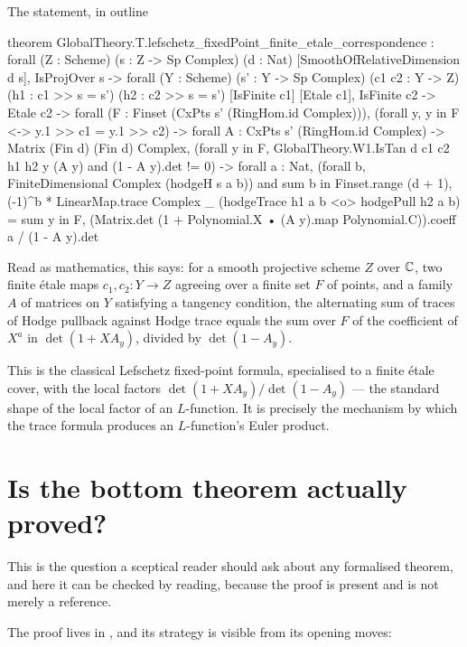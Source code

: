 \begin{seamnote}{The statement, in outline}
\begin{leanquote}
theorem GlobalTheory.T.lefschetz_fixedPoint_finite_etale_correspondence :
  forall (Z : Scheme) (s : Z -> Sp Complex) (d : Nat) [SmoothOfRelativeDimension d s],
    IsProjOver s ->
  forall (Y : Scheme) (s' : Y -> Sp Complex) (c1 c2 : Y -> Z)
    (h1 : c1 >> s = s') (h2 : c2 >> s = s') [IsFinite c1] [Etale c1],
    IsFinite c2 -> Etale c2 ->
  forall (F : Finset (CxPts s' (RingHom.id Complex))),
    (forall y, y in F <-> y.1 >> c1 = y.1 >> c2) ->
  forall A : CxPts s' (RingHom.id Complex) -> Matrix (Fin d) (Fin d) Complex,
    (forall y in F, GlobalTheory.W1.IsTan d c1 c2 h1 h2 y (A y)
                  and (1 - A y).det != 0) ->
  forall a : Nat,
    (forall b, FiniteDimensional Complex (hodgeH s a b)) and
    sum b in Finset.range (d + 1), (-1)^b * LinearMap.trace Complex _
        (hodgeTrace h1 a b <o> hodgePull h2 a b)
      = sum y in F, (Matrix.det (1 + Polynomial.X • (A y).map Polynomial.C)).coeff a
                     / (1 - A y).det
\end{leanquote}
\end{seamnote}

Read as mathematics, this says: for a smooth projective scheme $Z$ over
$\mathbb{C}$, two finite étale maps $c_1, c_2 : Y \to Z$ agreeing over a finite set
$F$ of points, and a family $A$ of matrices on $Y$ satisfying a tangency
condition, the alternating sum of traces of Hodge pullback against Hodge
trace equals the sum over $F$ of the coefficient of $X^a$ in
$\det(1 + X A_y)$, divided by $\det(1 - A_y)$.

This is the classical Lefschetz fixed-point formula, specialised to a finite
étale cover, with the local factors $\det(1 + X A_y)/\det(1 - A_y)$ --- the
standard shape of the local factor of an $L$-function. It is precisely the
mechanism by which the trace formula produces an $L$-function's Euler product.

\section{Is the bottom theorem actually proved?}This is the question a sceptical reader should ask about any formalised
theorem, and here it can be checked by reading, because the proof is present
and is not merely a reference.

The proof lives in
,
and its strategy is visible from its opening moves:


